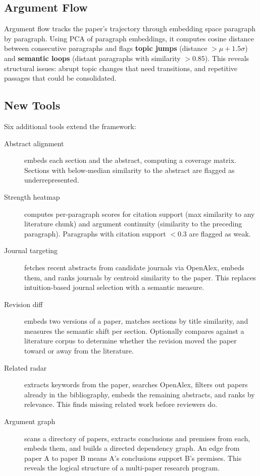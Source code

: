\documentclass[11pt,a4paper]{article}
\begin{document}
\subsection{Argument Flow}

Argument flow tracks the paper's trajectory through embedding space paragraph by paragraph. Using PCA of paragraph embeddings, it computes cosine distance between consecutive paragraphs and flags \textbf{topic jumps} (distance $> \mu + 1.5\sigma$) and \textbf{semantic loops} (distant paragraphs with similarity $> 0.85$). This reveals structural issues: abrupt topic changes that need transitions, and repetitive passages that could be consolidated.

\subsection{New Tools}

Six additional tools extend the framework:

\begin{description}
    \item[Abstract alignment] embeds each section and the abstract, computing a coverage matrix. Sections with below-median similarity to the abstract are flagged as underrepresented.

    \item[Strength heatmap] computes per-paragraph scores for citation support (max similarity to any literature chunk) and argument continuity (similarity to the preceding paragraph). Paragraphs with citation support $< 0.3$ are flagged as weak.

    \item[Journal targeting] fetches recent abstracts from candidate journals via OpenAlex, embeds them, and ranks journals by centroid similarity to the paper. This replaces intuition-based journal selection with a semantic measure.

    \item[Revision diff] embeds two versions of a paper, matches sections by title similarity, and measures the semantic shift per section. Optionally compares against a literature corpus to determine whether the revision moved the paper toward or away from the literature.

    \item[Related radar] extracts keywords from the paper, searches OpenAlex, filters out papers already in the bibliography, embeds the remaining abstracts, and ranks by relevance. This finds missing related work before reviewers do.

    \item[Argument graph] scans a directory of papers, extracts conclusions and premises from each, embeds them, and builds a directed dependency graph. An edge from paper A to paper B means A's conclusions support B's premises. This reveals the logical structure of a multi-paper research program.
\end{description}
\end{document}
